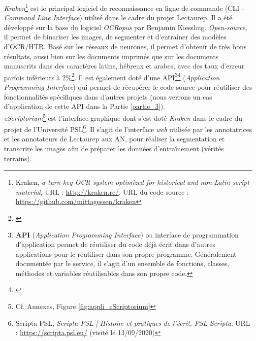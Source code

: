\textit{Kraken}\footnote{Kraken, \textit{a turn-key OCR system optimized for historical and non-Latin script material}, URL : \url{http://kraken.re/}, URL du code source : \url{https://github.com/mittagessen/kraken}} est le principal logiciel de reconnaissance en ligne de commande (CLI -\textit{Command Line Interface}) utilisé dans le cadre du projet Lectaurep. Il a été développé sur la base du logiciel \textit{OCRopus} par Benjamin Kiessling. \textit{Open-source}, il permet de binariser les images, de segmenter et d'entraîner des modèles d'OCR/HTR. Basé sur les réseaux de neurones, il permet d'obtenir de très bons résultats, aussi bien sur les documents imprimés que sur les documents manuscrits dans des caractères latins, hébreux et arabes, avec des taux d'erreur parfois inférieurs à 2\%\footnote{\cite{kiessling_important_2017}}. Il est également doté d'une API\footnote{\textbf{API} (\textit{Application Programming Interface}) ou interface de programmation d'application permet de réutiliser du code déjà écrit dans d'autres applications pour le réutiliser dans son propre programme. Généralement documentée par le service, il s'agit d'un ensemble de fonctions, classes, méthodes et variables réutilisables dans son propre code.}\footnote{\cite{noauthor_kraken_nodate}} (\textit{Application Programming Interface}) qui permet de récupérer le code source pour réutiliser des fonctionnalités spécifiques dans d'autres projets (nous verrons un cas d'application de cette API dans la Partie \ref{partie_3}).\\

\textit{eScriptorium}\footnote{Cf. Annexes, Figure \ref{fig:appli_eScriptorium}} est l'interface graphique dont s'est doté \textit{Kraken} dans le cadre du projet  de l'Université PSL\footnote{Scripta PSL, \textit{Scripta PSL | Histoire et pratiques de l’écrit, PSL Scripta}, URL : \url{https://scripta.psl.eu/} (visité le 13/09/2020)}. Il s'agit de l'interface \textit{web} utilisée par les annotatrices et les annotateurs de Lectaurep aux AN, pour réaliser la segmentation et transcrire les images afin de préparer les données d'entraînement (vérités terrains).\\

